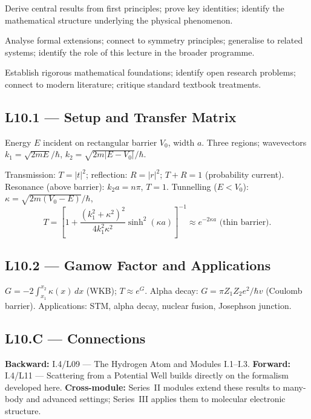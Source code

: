 \quad
Derive central results from first principles; prove key identities; identify
the mathematical structure underlying the physical phenomenon.

\quad
Analyse formal extensions; connect to symmetry principles; generalise to
related systems; identify the role of this lecture in the broader programme.

\quad
Establish rigorous mathematical foundations; identify open research problems;
connect to modern literature; critique standard textbook treatments.


\subsection*{L10.1 — Setup and Transfer Matrix}
Energy $E$ incident on rectangular barrier $V_0$, width $a$.
Three regions; wavevectors $k_1=\sqrt{2mE}/\hbar$, $k_2=\sqrt{2m|E-V_0|}/\hbar$.

\begin{tcolorbox}[lecturebox, title={Transmission and Reflection}]
Transmission: $T = |t|^2$; reflection: $R = |r|^2$; $T+R=1$ (probability current).
Resonance (above barrier): $k_2 a = n\pi$, $T=1$.
Tunnelling ($E<V_0$): $\kappa = \sqrt{2m(V_0-E)}/\hbar$,
\begin{equation}
  T = \left[1+\frac{(k_1^2+\kappa^2)^2}{4k_1^2\kappa^2}\sinh^2(\kappa a)\right]^{-1}
  \approx e^{-2\kappa a}\text{ (thin barrier)}.
  \label{eq:L10.1}
\end{equation}
\end{tcolorbox}

\subsection*{L10.2 — Gamow Factor and Applications}
$G = -2\int_{x_1}^{x_2}\kappa(x)\,dx$ (WKB); $T\approx e^G$.
Alpha decay: $G = \pi Z_1 Z_2 e^2/\hbar v$ (Coulomb barrier).
Applications: STM, alpha decay, nuclear fusion, Josephson junction.


\subsection*{L10.C — Connections}
\label{sec:L10.C}
\textbf{Backward:} I.4/L09 — The Hydrogen Atom and Modules I.1–I.3.
\textbf{Forward:} I.4/L11 — Scattering from a Potential Well builds directly on the formalism developed here.
\textbf{Cross-module:} Series~II modules extend these results to many-body and
advanced settings; Series~III applies them to molecular electronic structure.

